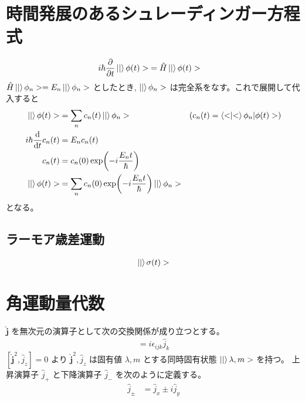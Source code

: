 \documentclass[uplatex,dvipdfmx,a4paper,11pt]{jlreq}
\numberwithin{equation}{section}
\theoremstyle{definition}
\begin{document}
\section{時間発展のあるシュレーディンガー方程式}
\begin{align}
  i\hbar\pdv{t}\ket|\phi(t)> & = \hat{H}\ket|\phi(t)>
\end{align}
$\hat{H}\ket|\phi_n> = E_n\ket|\phi_n>$ としたとき, $\ket|\phi_n>$ は完全系をなす。これで展開して代入すると
\begin{align}
  \ket|\phi(t)>      & = \sum_nc_n(t)\ket|\phi_n>                           & \qty(c_n(t) = \braket<\phi_n|\phi(t)>) \\
  i\hbar\dv{t}c_n(t) & = E_nc_n(t)                                                                                   \\
  c_n(t)             & = c_n(0)\exp(-i\frac{E_nt}{\hbar})                                                            \\
  \ket|\phi(t)>      & = \sum_nc_n(0)\exp(-i\frac{E_nt}{\hbar})\ket|\phi_n>
\end{align}
となる。


\subsection{ラーモア歳差運動}
\begin{align}
  \ket|\sigma(t)>
\end{align}



\section{角運動量代数}
\begin{definition}
  $\hat{\bm{j}}$ を無次元の演算子として次の交換関係が成り立つとする。
  \begin{align}
    [\hat{j}_i, \hat{j}_j] = i\epsilon_{ijk}\hat{j}_k
  \end{align}
  $[\hat{\bm{j}}^2, \hat{j}_z] = 0$ より $\hat{\bm{j}}^2, \hat{j}_z$ は固有値 $\lambda, m$ とする同時固有状態 $\ket|\lambda, m>$ を持つ。
  上昇演算子 $\hat{j}_+$ と下降演算子 $\hat{j}_-$ を次のように定義する。
  \begin{align}
    \hat{j}_\pm & = \hat{j}_x \pm i\hat{j}_y
  \end{align}
\end{definition}
\end{document}
